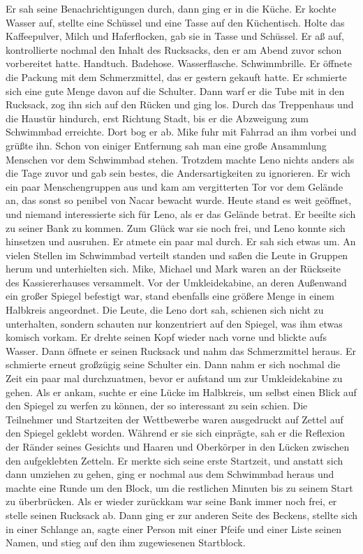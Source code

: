 \documentclass[ngerman,smalldemyvopaper,11pt,oneside,onecolumn,openright,extrafontsizes]{memoir}
\begin{document}
Er sah seine Benachrichtigungen durch, dann ging er in die Küche. Er kochte Wasser auf, stellte eine Schüssel und eine Tasse auf den Küchentisch. Holte das Kaffeepulver, Milch und Haferflocken, gab sie in Tasse und Schüssel. Er aß auf, kontrollierte nochmal den Inhalt des Rucksacks, den er am Abend zuvor schon vorbereitet hatte. Handtuch. Badehose. Wasserflasche. Schwimmbrille. Er öffnete die Packung mit dem Schmerzmittel, das er gestern gekauft hatte. Er schmierte sich eine gute Menge davon auf die Schulter. Dann warf er die Tube mit in den Rucksack, zog ihn sich auf den Rücken und ging los. Durch das Treppenhaus und die Haustür hindurch, erst Richtung Stadt, bis er die Abzweigung zum Schwimmbad erreichte. Dort bog er ab. Mike fuhr mit Fahrrad an ihm vorbei und grüßte ihn. Schon von einiger Entfernung sah man eine große Ansammlung Menschen vor dem Schwimmbad stehen. Trotzdem machte Leno nichts anders als die Tage zuvor und gab sein bestes, die Andersartigkeiten zu ignorieren. Er wich ein paar Menschengruppen aus und kam am vergitterten Tor vor dem Gelände an, das sonst so penibel von Nacar bewacht wurde. Heute stand es weit geöffnet, und niemand interessierte sich für Leno, als er das Gelände betrat. Er beeilte sich zu seiner Bank zu kommen. Zum Glück war sie noch frei, und Leno konnte sich hinsetzen und ausruhen. Er atmete ein paar mal durch. Er sah sich etwas um. An vielen Stellen im Schwimmbad verteilt standen und saßen die Leute in Gruppen herum und unterhielten sich. Mike, Michael und Mark waren an der Rückseite des Kassiererhauses versammelt. Vor der Umkleidekabine, an deren Außenwand ein großer Spiegel befestigt war, stand ebenfalls eine größere Menge in einem Halbkreis angeordnet. Die Leute, die Leno dort sah, schienen sich nicht zu unterhalten, sondern schauten nur konzentriert auf den Spiegel, was ihm etwas komisch vorkam. Er drehte seinen Kopf wieder nach vorne und blickte aufs Wasser. Dann öffnete er seinen Rucksack und nahm das Schmerzmittel heraus. Er schmierte erneut großzügig seine Schulter ein. Dann nahm er sich nochmal die Zeit ein paar mal durchzuatmen, bevor er aufstand um zur Umkleidekabine zu gehen. Als er ankam, suchte er eine Lücke im Halbkreis, um selbst einen Blick auf den Spiegel zu werfen zu können, der so interessant zu sein schien. Die Teilnehmer und Startzeiten der Wettbewerbe waren ausgedruckt auf Zettel auf den Spiegel geklebt worden. Während er sie sich einprägte, sah er die Reflexion der Ränder seines Gesichts und Haaren und Oberkörper in den Lücken zwischen den aufgeklebten Zetteln. Er merkte sich seine erste Startzeit, und anstatt sich dann umziehen zu gehen, ging er nochmal aus dem Schwimmbad heraus und machte eine Runde um den Block, um die restlichen Minuten bis zu seinem Start zu überbrücken. Als er wieder zurückkam war seine Bank immer noch frei, er stelle seinen Rucksack ab. Dann ging er zur anderen Seite des Beckens, stellte sich in einer Schlange an, sagte einer Person mit einer Pfeife und einer Liste seinen Namen, und stieg auf den ihm zugewiesenen Startblock.
\end{document}
